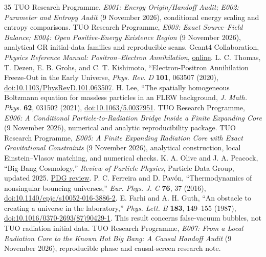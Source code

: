 \documentclass[11pt,a4paper]{article}
\theoremstyle{tmon}
\theoremstyle{definition}
\begin{document}
\begin{thebibliography}{35}
TUO Research Programme, \emph{E001: Energy Origin/Handoff Audit; E002: Parameter and Entropy Audit} (9 November 2026), conditional energy scaling and entropy comparisons.
TUO Research Programme, \emph{E003: Exact Source--Field Balance; E004: Open Positive-Energy Existence Region} (9 November 2026), analytical GR initial-data families and reproducible scans.
Geant4 Collaboration, \emph{Physics Reference Manual: Positron--Electron Annihilation}, \href{https://geant4.web.cern.ch/documentation/dev/prm_html/PhysicsReferenceManual/electromagnetic/electron_incident/annil.html}{online}.
L. C. Thomas, T. Dezen, E. B. Grohs, and C. T. Kishimoto, ``Electron-Positron Annihilation Freeze-Out in the Early Universe, \emph{Phys. Rev. D} \textbf{101}, 063507 (2020), \href{https://doi.org/10.1103/PhysRevD.101.063507}{doi:10.1103/PhysRevD.101.063507}.
H. Lee, ``The spatially homogeneous Boltzmann equation for massless particles in an FLRW background, \emph{J. Math. Phys.} \textbf{62}, 031502 (2021), \href{https://doi.org/10.1063/5.0037951}{doi:10.1063/5.0037951}.
TUO Research Programme, \emph{E006: A Conditional Particle-to-Radiation Bridge Inside a Finite Expanding Core} (9 November 2026), numerical and analytic reproducibility package.
TUO Research Programme, \emph{E005: A Finite Expanding Radiation Core with Exact Gravitational Constraints} (9 November 2026), analytical construction, local Einstein--Vlasov matching, and numerical checks.
K. A. Olive and J. A. Peacock, ``Big-Bang Cosmology,'' \emph{Review of Particle Physics}, Particle Data Group, updated 2025. \href{https://pdgweb.lbl.gov/2025/reviews/rpp2025-rev-bbang-cosmology.pdf}{PDG review}.
P. C. Ferreira and D. Pav\'on, ``Thermodynamics of nonsingular bouncing universes,'' \emph{Eur. Phys. J. C} \textbf{76}, 37 (2016), \href{https://doi.org/10.1140/epjc/s10052-016-3886-2}{doi:10.1140/epjc/s10052-016-3886-2}.
E. Farhi and A. H. Guth, ``An obstacle to creating a universe in the laboratory,'' \emph{Phys. Lett. B} \textbf{183}, 149--155 (1987), \href{https://doi.org/10.1016/0370-2693(87)90429-1}{doi:10.1016/0370-2693(87)90429-1}. This result concerns false-vacuum bubbles, not TUO radiation initial data.
TUO Research Programme, \emph{E007: From a Local Radiation Core to the Known Hot Big Bang: A Causal Handoff Audit} (9 November 2026), reproducible phase and causal-screen research note.

\end{thebibliography}
\end{document}
